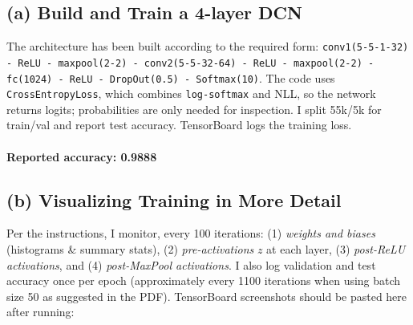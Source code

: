 \documentclass[11pt]{article}
\begin{document}
\subsection{(a) Build and Train a 4-layer DCN}
The architecture has been built according to the required form: \texttt{conv1(5-5-1-32) - ReLU - maxpool(2-2) - conv2(5-5-32-64) - ReLU - maxpool(2-2) - fc(1024) - ReLU - DropOut(0.5) - Softmax(10)}. The code uses \texttt{CrossEntropyLoss}, which combines \texttt{log-softmax} and NLL, so the network returns logits; probabilities are only needed for inspection. I split 55k/5k for train/val and report test accuracy. TensorBoard logs the training loss.

\paragraph{Reported accuracy: 0.9888 } 

\subsection{(b) Visualizing Training in More Detail}
Per the instructions, I monitor, every 100 iterations: (1) \emph{weights and biases} (histograms \& summary stats), (2) \emph{pre-activations} \(z\) at each layer, (3) \emph{post-ReLU activations}, and (4) \emph{post-MaxPool activations}. I also log validation and test accuracy once per epoch (approximately every 1100 iterations when using batch size 50 as suggested in the PDF). TensorBoard screenshots should be pasted here after running:
\end{document}
